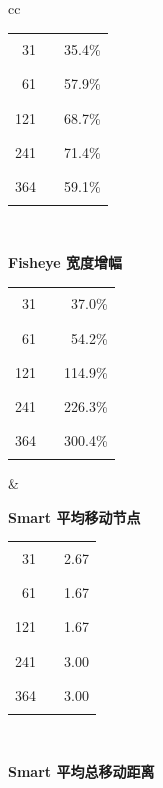 \documentclass[11pt,a4paper,oneside,extrafontsizes]{memoir}
\begin{document}
\begin{center}
\begin{figure}[htbp]
\begin{tabular}{cc}
\begin{minipage}[t]{0.46\textwidth}
\begin{tabular}{@{}r l r@{}}
31 & \textcolor{blue!70!black}{\rule{0.0992\textwidth}{1.1ex}} & 35.4\% \\
61 & \textcolor{blue!70!black}{\rule{0.1623\textwidth}{1.1ex}} & 57.9\% \\
121 & \textcolor{blue!70!black}{\rule{0.1926\textwidth}{1.1ex}} & 68.7\% \\
241 & \textcolor{blue!70!black}{\rule{0.2000\textwidth}{1.1ex}} & 71.4\% \\
364 & \textcolor{blue!70!black}{\rule{0.1656\textwidth}{1.1ex}} & 59.1\% \\
\end{tabular}
\end{minipage} \\[1.2em]
\begin{minipage}[t]{0.46\textwidth}
\centering
\textbf{Fisheye 宽度增幅}\\[-0.2em]

\begin{tabular}{@{}r l r@{}}
31 & \textcolor{blue!70!black}{\rule{0.0247\textwidth}{1.1ex}} & 37.0\% \\
61 & \textcolor{blue!70!black}{\rule{0.0361\textwidth}{1.1ex}} & 54.2\% \\
121 & \textcolor{blue!70!black}{\rule{0.0765\textwidth}{1.1ex}} & 114.9\% \\
241 & \textcolor{blue!70!black}{\rule{0.1507\textwidth}{1.1ex}} & 226.3\% \\
364 & \textcolor{blue!70!black}{\rule{0.2000\textwidth}{1.1ex}} & 300.4\% \\
\end{tabular}
\end{minipage}
&
\begin{minipage}[t]{0.46\textwidth}
\centering
\textbf{Smart 平均移动节点}\\[-0.2em]

\begin{tabular}{@{}r l r@{}}
31 & \textcolor{blue!70!black}{\rule{0.1780\textwidth}{1.1ex}} & 2.67 \\
61 & \textcolor{blue!70!black}{\rule{0.1113\textwidth}{1.1ex}} & 1.67 \\
121 & \textcolor{blue!70!black}{\rule{0.1113\textwidth}{1.1ex}} & 1.67 \\
241 & \textcolor{blue!70!black}{\rule{0.2000\textwidth}{1.1ex}} & 3.00 \\
364 & \textcolor{blue!70!black}{\rule{0.2000\textwidth}{1.1ex}} & 3.00 \\
\end{tabular}
\end{minipage} \\[1.2em]
\begin{minipage}[t]{0.46\textwidth}
\centering
\textbf{Smart 平均总移动距离}\\[-0.2em]


\end{minipage}
\end{tabular}
\end{figure}
\end{center}
\end{document}
